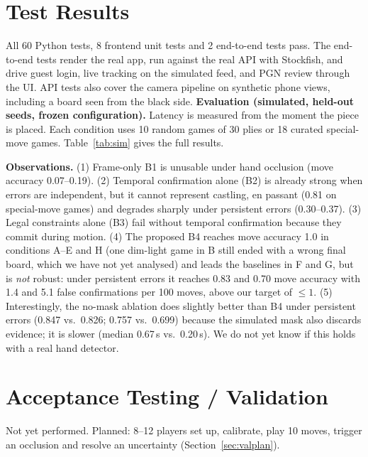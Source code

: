 \section{Test Results}\label{sec:results}
All 60 Python tests, 8 frontend unit tests and 2 end-to-end tests pass. The end-to-end tests render the real app, run
against the real API with Stockfish, and drive guest login, live tracking on the simulated feed, and PGN review through the UI.
API tests also cover the camera pipeline on synthetic phone views, including a board seen from the black side. \textbf{Evaluation (simulated, held-out seeds, frozen configuration).} Latency is measured from the
moment the piece is placed. Each condition uses 10 random games of 30 plies or 18 curated special-move games.
Table~\ref{tab:sim} gives the full results.
{\small}
\label{tab:sim}

\textbf{Observations.} (1) Frame-only B1 is unusable under hand occlusion (move accuracy 0.07--0.19). (2) Temporal
confirmation alone (B2) is already strong when errors are independent, but it cannot represent castling, en passant
(0.81 on special-move games) and degrades sharply under persistent errors (0.30--0.37). (3) Legal constraints alone (B3) fail without
temporal confirmation because they commit during motion. (4) The proposed B4 reaches move accuracy 1.0 in conditions A--E and H (one dim-light game in B still ended with a wrong final board, which we have not yet analysed) and
leads the baselines in F and G, but is \emph{not} robust: under persistent errors it reaches 0.83 and 0.70
move accuracy with 1.4 and 5.1 false confirmations per 100 moves, above our target of $\leq1$.
(5) Interestingly, the no-mask ablation does slightly better than B4 under persistent errors (0.847 vs.\ 0.826;
0.757 vs.\ 0.699) because the simulated mask also discards evidence; it is slower (median 0.67\,s vs.\ 0.20\,s).
We do not yet know if this holds with a real hand detector.

\section{Acceptance Testing / Validation}
Not yet performed. Planned: 8--12 players set up, calibrate, play 10 moves, trigger an occlusion and resolve an
uncertainty (Section~\ref{sec:valplan}).

